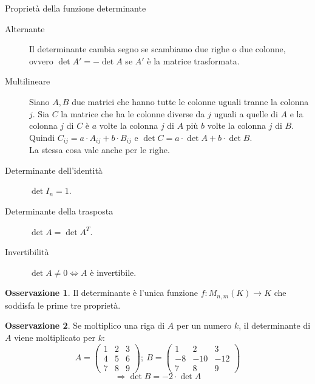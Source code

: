 \documentclass[a4paper]{article}
\theoremstyle{definition}
\newtheorem*{oss}{Osservazione}
\begin{document}
\begin{deff}{Proprietà della funzione determinante}{}
	\begin{description}
		\item[Alternante] Il determinante cambia segno se scambiamo due righe o due colonne, ovvero $\det A' = - \det A$ se $A'$ è la matrice trasformata.
		\item[Multilineare] Siano $A, B$ due matrici che hanno tutte le colonne uguali tranne la colonna $j$.
		Sia $C$ la matrice che ha le colonne diverse da $j$ uguali a quelle di $A$ e la colonna $j$ di $C$ è $a$ volte la colonna $j$ di $A$ più $b$ volte la colonna $j$ di $B$. \\
		Quindi $C_{ij} = a \cdot A_{ij} + b \cdot B_{ij}$ e $\det C = a \cdot \det A + b \cdot \det B$. \\
		La stessa cosa vale anche per le righe.
		\item[Determinante dell'identità] $\det I_n = 1$.
		\item[Determinante della trasposta] $\det A = \det A^T$.
		\item[Invertibilità] $\det A \ne 0 \Leftrightarrow A$ è invertibile.
	\end{description}
\end{deff}
\begin{oss}
	Il determinante è l'unica funzione $f: M_{n,m}(K) \rightarrow K$ che soddisfa le prime tre proprietà.
\end{oss}

\begin{oss}
	Se moltiplico una riga di $A$ per un numero $k$, il determinante di $A$ viene moltiplicato per $k$:
	\[A = \begin{pmatrix}
		1 & 2 & 3 \\
		4 & 5 & 6 \\
		7 & 8 & 9
	\end{pmatrix}; \ B = \begin{pmatrix}
		1 & 2 & 3 \\
		-8 & -10 & -12 \\
		7 & 8 & 9
	\end{pmatrix} \]
	\[\Rightarrow \det B = - 2 \cdot \det A\]
\end{oss}
\end{document}
